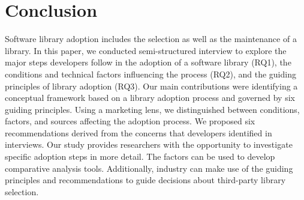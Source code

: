 
\section{Conclusion}
Software library adoption includes the selection as well as the maintenance of a library. In this paper, we conducted \numInterviews semi-structured interview to explore the major steps developers follow in the adoption of a software library (RQ1), the conditions and technical factors influencing the process (RQ2), and the guiding principles of library adoption (RQ3). Our main contributions were identifying a conceptual framework based on a library adoption process and governed by six guiding principles. Using a marketing lens, we distinguished between conditions, factors, and sources affecting the adoption process. We proposed six recommendations derived from the concerns that developers identified in interviews. Our study provides researchers with the opportunity to investigate specific adoption steps in more detail. The factors can be used to develop comparative analysis tools. Additionally, industry can make use of the guiding principles and recommendations to guide decisions about third-party library selection.





 


